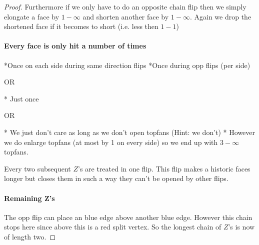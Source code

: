 \begin{proof}
    Furthermore if we only have to do an opposite chain flip then we simply elongate a face by $1-\infty$ and shorten another face by $1-\infty$. Again we drop the shortened face if it becomes to short (i.e. less then $1-1$)

    \paragraph{Every face is only hit a number of times}
    *Once on each side during same direction flips
    *Once during opp flips (per side)

    OR

    * Just once

    OR

    * We just don't care as long as we don't open topfans (Hint: we don't)
    * However we do enlarge topfans (at most by 1 on every side) so we end up with $3-\infty$ topfans.

    Every two subsequent $Z$'s are treated in one flip. This flip makes a historic faces longer but closes them in such a way they can't be opened by other flips.

    \paragraph{Remaining Z's}
    The opp flip can place an blue edge above another blue edge. However this chain stops here since above this is a red split vertex. So the longest chain of $Z$'s is now of length two.
  \end{proof}
